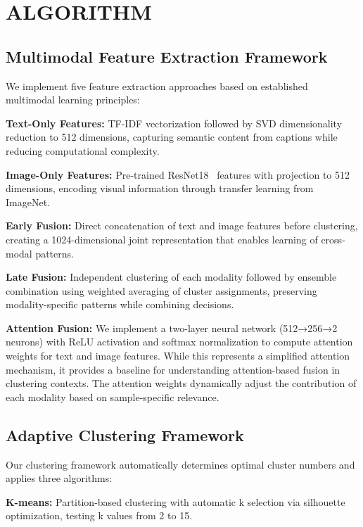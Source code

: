 \documentclass[sigconf]{acmart}
\begin{document}
\section{ALGORITHM}

\subsection{Multimodal Feature Extraction Framework}

We implement five feature extraction approaches based on established multimodal learning principles:

\textbf{Text-Only Features:} TF-IDF vectorization followed by SVD dimensionality reduction to 512 dimensions, capturing semantic content from captions while reducing computational complexity.

\textbf{Image-Only Features:} Pre-trained ResNet18~\cite{he2016deep} features with projection to 512 dimensions, encoding visual information through transfer learning from ImageNet.

\textbf{Early Fusion:} Direct concatenation of text and image features before clustering, creating a 1024-dimensional joint representation that enables learning of cross-modal patterns.

\textbf{Late Fusion:} Independent clustering of each modality followed by ensemble combination using weighted averaging of cluster assignments, preserving modality-specific patterns while combining decisions.

\textbf{Attention Fusion:} We implement a two-layer neural network (512→256→2 neurons) with ReLU activation and softmax normalization to compute attention weights for text and image features. While this represents a simplified attention mechanism, it provides a baseline for understanding attention-based fusion in clustering contexts. The attention weights dynamically adjust the contribution of each modality based on sample-specific relevance.

\subsection{Adaptive Clustering Framework}

Our clustering framework automatically determines optimal cluster numbers and applies three algorithms:

\textbf{K-means:} Partition-based clustering with automatic k selection via silhouette optimization, testing k values from 2 to 15.
\end{document}
